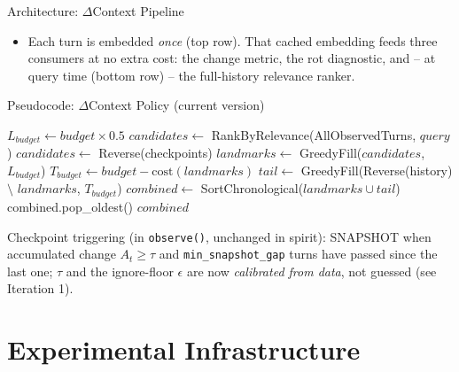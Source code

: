 \documentclass[aspectratio=169]{beamer}
\begin{document}
\begin{frame}{Architecture: $\Delta$Context Pipeline}
    \begin{itemize}
        \item Each turn is embedded \emph{once} (top row). That cached embedding feeds three consumers at no extra cost: the change metric, the rot diagnostic, and -- at query time (bottom row) -- the full-history relevance ranker.
    \end{itemize}
\end{frame}

\begin{frame}[fragile]{Pseudocode: $\Delta$Context Policy (current version)}
  \begin{algorithm}[H]
    \caption{build\_context(history, query, budget)}
    \begin{algorithmic}[1]
      \State $L_{budget} \gets budget \times 0.5$ 
        \State $candidates \gets$ RankByRelevance(AllObservedTurns, $query$) 
      \Else
        \State $candidates \gets$ Reverse(checkpoints) 
      \EndIf
      \State $landmarks \gets$ GreedyFill($candidates$, $L_{budget}$) 
      \State $T_{budget} \gets budget - \text{cost}(landmarks)$
      \State $tail \gets$ GreedyFill(Reverse(history) $\setminus$ $landmarks$, $T_{budget}$)
      \State $combined \gets$ SortChronological($landmarks \cup tail$)
       
        \State combined.pop\_oldest()
      \EndWhile
      \State \Return $combined$
    \end{algorithmic}
  \end{algorithm}
  \small Checkpoint triggering (in \texttt{observe()}, unchanged in spirit): SNAPSHOT when accumulated change $A_t \geq \tau$ and \texttt{min\_snapshot\_gap} turns have passed since the last one; $\tau$ and the ignore-floor $\epsilon$ are now \emph{calibrated from data}, not guessed (see Iteration 1).
\end{frame}

\section{Experimental Infrastructure}
\end{document}
